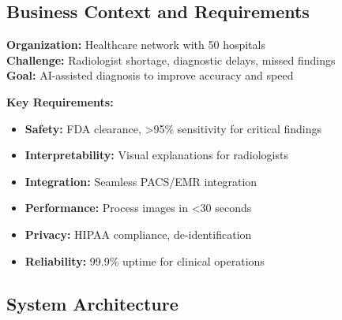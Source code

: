 \subsection{Business Context and Requirements}

\textbf{Organization:} Healthcare network with 50 hospitals\\
\textbf{Challenge:} Radiologist shortage, diagnostic delays, missed findings\\
\textbf{Goal:} AI-assisted diagnosis to improve accuracy and speed

\textbf{Key Requirements:}

\begin{itemize}
    \item \textbf{Safety:} FDA clearance, >95\% sensitivity for critical findings
    \item \textbf{Interpretability:} Visual explanations for radiologists
    \item \textbf{Integration:} Seamless PACS/EMR integration
    \item \textbf{Performance:} Process images in <30 seconds
    \item \textbf{Privacy:} HIPAA compliance, de-identification
    \item \textbf{Reliability:} 99.9\% uptime for clinical operations
\end{itemize}

\subsection{System Architecture}

